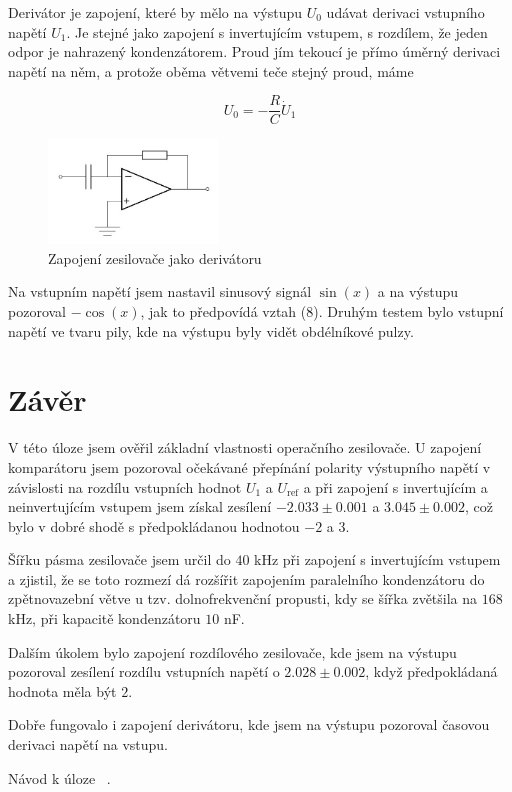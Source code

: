 \documentclass[a4paper,11pt]{article}
\begin{document}
Derivátor je zapojení, které by mělo na výstupu $ U_0 $ udávat derivaci vstupního napětí $ U_1 $. Je stejné jako zapojení s invertujícím vstupem, s rozdílem, že jeden odpor je nahrazený kondenzátorem. Proud jím tekoucí je přímo úměrný derivaci napětí na něm, a protože oběma větvemi teče stejný proud, máme

\begin{equation}
U_0 = - \frac{R}{C} \dot U_1
\end{equation}


\begin{figure}[htpb]
    \centering
    \includegraphics[width=0.4\textwidth]{derivator_sch.jpg}
    \caption{Zapojení zesilovače jako derivátoru}
\end{figure}


Na vstupním napětí jsem nastavil sinusový signál $ \sin(x) $  a na výstupu pozoroval $ - \cos(x) $, jak to předpovídá vztah (8). Druhým testem bylo vstupní napětí ve tvaru pily, kde na výstupu byly vidět obdélníkové pulzy. 

\section{Závěr}

V této úloze jsem ověřil základní vlastnosti operačního zesilovače. U zapojení komparátoru jsem pozoroval očekávané přepínání polarity výstupního napětí v závislosti na rozdílu vstupních hodnot $U_1$ a $U_\text{ref}$ a při zapojení s invertujícím a neinvertujícím vstupem jsem získal zesílení $-2.033 \pm 0.001$ a $ 3.045 \pm 0.002 $, což bylo v dobré shodě s předpokládanou hodnotou $ -2 $ a $ 3 $.

Šířku pásma zesilovače jsem určil do $40 $ kHz při zapojení s invertujícím vstupem a zjistil, že se toto rozmezí dá rozšířit zapojením paralelního kondenzátoru do zpětnovazební větve u tzv. dolnofrekvenční propusti, kdy se šířka zvětšila na $ 168 $  kHz, při kapacitě kondenzátoru $ 10 $ nF.

Dalším úkolem bylo zapojení rozdílového zesilovače, kde jsem na výstupu pozoroval zesílení rozdílu vstupních napětí o $ 2.028 \pm 0.002 $, když předpokládaná hodnota měla být $ 2 $.

Dobře fungovalo i zapojení derivátoru, kde jsem na výstupu pozoroval časovou derivaci napětí na vstupu. 



\begin{thebibliography}{0}
 Návod k úloze ~\url{}.   
\end{thebibliography}
\end{document}
